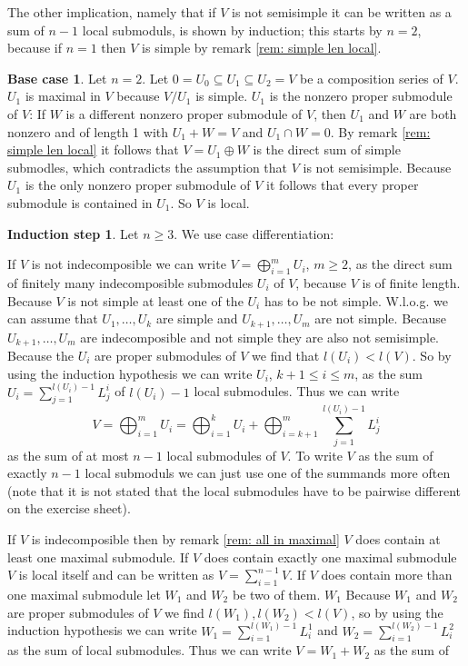 \documentclass[a4paper,10pt]{article}
\theoremstyle{definition}
\newtheorem*{ia}{Base case}
\newtheorem*{is}{Induction step}
\begin{document}
The other implication, namely that if $V$ is not semisimple it can be written as a sum of $n-1$ local submoduls, is shown by induction; this starts by $n=2$, because if $n=1$ then $V$ is simple by remark \ref{rem: simple len local}.
\begin{ia}
 Let $n=2$. Let $0 = U_0 \subseteq U_1 \subseteq U_2 = V$ be a composition series of $V$. $U_1$ is maximal in $V$ because $V/U_1$ is simple. $U_1$ is the nonzero proper submodule of $V$: If $W$ is a different nonzero proper submodule of $V$, then $U_1$ and $W$ are both nonzero and of length 1 with $U_1 + W = V$ and $U_1 \cap W = 0$. By remark \ref{rem: simple len local} it follows that $V = U_1 \oplus W$ is the direct sum of simple submodles, which contradicts the assumption that $V$ is not semisimple. Because $U_1$ is the only nonzero proper submodule of $V$ it follows that every proper submodule is contained in $U_1$. So $V$ is local.
\end{ia}
\begin{is}
 Let $n \geq 3$.
 We use case differentiation:
 
 If $V$ is not indecomposible we can write $V = \bigoplus_{i=1}^m U_i$, $m \geq 2$, as the direct sum of finitely many indecomposible submodules $U_i$ of $V$, because $V$ is of finite length. Because $V$ is not simple at least one of the $U_i$ has to be not simple. W.l.o.g. we can assume that $U_1, \ldots, U_k$ are simple and $U_{k+1}, \ldots, U_m$ are not simple. Because $U_{k+1}, \ldots, U_m$ are indecomposible and not simple they are also not semisimple. Because the $U_i$ are proper submodules of $V$ we find that $l(U_i) < l(V)$. So by using the induction hypothesis we can write $U_i$, $k+1 \leq i \leq m$, as the sum $U_i = \sum_{j=1}^{l(U_i)-1} L^i_j$ of $l(U_i)-1$ local submodules. Thus we can write
 \[
  V = \bigoplus_{i=1}^m U_i = \bigoplus_{i=1}^k U_i + \bigoplus_{i=k+1}^m \sum_{j=1}^{l(U_i)-1} L^i_j
 \]
 as the sum of at most $n-1$ local submodules of $V$. To write $V$ as the sum of exactly $n-1$ local submoduls we can just use one of the summands more often (note that it is not stated that the local submodules have to be pairwise different on the exercise sheet).
 
 If $V$ is indecomposible then by remark \ref{rem: all in maximal} $V$ does contain at least one maximal submodule. If $V$ does contain exactly one maximal submodule $V$ is local itself and can be written as $V = \sum_{i=1}^{n-1} V$. If $V$ does contain more than one maximal submodule let $W_1$ and $W_2$ be two of them. $W_1$ Because $W_1$ and $W_2$ are proper submodules of $V$ we find $l(W_1), l(W_2) < l(V)$, so by using the induction hypothesis we can write $W_1 = \sum_{i=1}^{l(W_1)-1} L^1_i$ and $W_2 = \sum_{i=1}^{l(W_2)-1} L^2_i$ as the sum of local submodules. Thus we can write $V = W_1 + W_2$ as the sum of 
\end{is}
\end{document}
